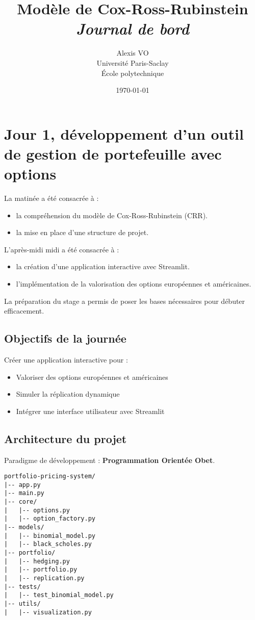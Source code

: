 \documentclass[a4paper,11pt]{article}
\title{\Huge{\textbf{Modèle de Cox-Ross-Rubinstein}}\\ \medskip
      \Huge{\textit{Journal de bord}}\vspace*{0.7cm}}
\author{\LARGE{Alexis VO}\vspace{1cm}\\ \medskip
      Université Paris-Saclay\\École polytechnique}
\date{\vspace{0.2cm}\today}
\begin{document}
\maketitle
\newpage
\tableofcontents
\newpage


\section{Jour 1, développement d’un outil de gestion de portefeuille avec options}
\noindent La matinée a été consacrée à :
\begin{itemize}
    \item la compréhension du modèle de Cox-Ross-Rubinstein (CRR).
    \item la mise en place d'une structure de projet.
\end{itemize}
L'après-midi midi a été consacrée à :
\begin{itemize}
    \item la création d'une application interactive avec Streamlit.
    \item l'implémentation de la valorisation des options européennes et américaines.
\end{itemize}
La préparation du stage a permis de poser les bases nécessaires pour débuter efficacement.

\subsection{Objectifs de la journée}
Créer une application interactive pour :
\begin{itemize}
    \item Valoriser des options européennes et américaines
    \item Simuler la réplication dynamique
    \item Intégrer une interface utilisateur avec Streamlit
\end{itemize}

\subsection{Architecture du projet}
Paradigme de développement : \textbf{Programmation Orientée Obet}.
\begin{verbatim}
portfolio-pricing-system/
|-- app.py
|-- main.py
|-- core/
|   |-- options.py
|   |-- option_factory.py
|-- models/
|   |-- binomial_model.py
|   |-- black_scholes.py
|-- portfolio/
|   |-- hedging.py
|   |-- portfolio.py
|   |-- replication.py
|-- tests/
|   |-- test_binomial_model.py
|-- utils/
|   |-- visualization.py
\end{verbatim}
\end{document}
